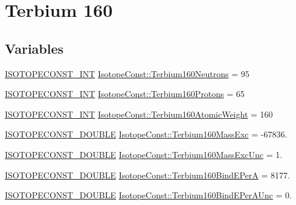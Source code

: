 \hypertarget{group___isotope_const-_terbium-_tb160}{}\section{Terbium 160}
\label{group___isotope_const-_terbium-_tb160}
\subsection*{Variables}
\begin{DoxyCompactItemize}
\item 
\mbox{\hyperlink{group___isotope_const-_macros_ga5f18360b3e99483a35c32d789e62621c}{I\+S\+O\+T\+O\+P\+E\+C\+O\+N\+S\+T\+\_\+\+I\+NT}} \mbox{\hyperlink{group___isotope_const-_terbium-_tb160_ga1d6cff90fdb1ebc29bb4fb3bbe757907}{Isotope\+Const\+::\+Terbium160\+Neutrons}} = 95
\item 
\mbox{\hyperlink{group___isotope_const-_macros_ga5f18360b3e99483a35c32d789e62621c}{I\+S\+O\+T\+O\+P\+E\+C\+O\+N\+S\+T\+\_\+\+I\+NT}} \mbox{\hyperlink{group___isotope_const-_terbium-_tb160_gae76b8fa4c5430a6d603b71c767d3b60d}{Isotope\+Const\+::\+Terbium160\+Protons}} = 65
\item 
\mbox{\hyperlink{group___isotope_const-_macros_ga5f18360b3e99483a35c32d789e62621c}{I\+S\+O\+T\+O\+P\+E\+C\+O\+N\+S\+T\+\_\+\+I\+NT}} \mbox{\hyperlink{group___isotope_const-_terbium-_tb160_gafd3d56c9b8c092c68b61b9749023f80b}{Isotope\+Const\+::\+Terbium160\+Atomic\+Weight}} = 160
\item 
\mbox{\hyperlink{group___isotope_const-_macros_ga8f45a7272ce02c0b4c65c44636ed719a}{I\+S\+O\+T\+O\+P\+E\+C\+O\+N\+S\+T\+\_\+\+D\+O\+U\+B\+LE}} \mbox{\hyperlink{group___isotope_const-_terbium-_tb160_gaaa163c7db9e426a24c9a46fc5c3fe41c}{Isotope\+Const\+::\+Terbium160\+Mass\+Exc}} = -\/67836.
\item 
\mbox{\hyperlink{group___isotope_const-_macros_ga8f45a7272ce02c0b4c65c44636ed719a}{I\+S\+O\+T\+O\+P\+E\+C\+O\+N\+S\+T\+\_\+\+D\+O\+U\+B\+LE}} \mbox{\hyperlink{group___isotope_const-_terbium-_tb160_ga47c2153b6b83c16c4cf5cf327f677b34}{Isotope\+Const\+::\+Terbium160\+Mass\+Exc\+Unc}} = 1.
\item 
\mbox{\hyperlink{group___isotope_const-_macros_ga8f45a7272ce02c0b4c65c44636ed719a}{I\+S\+O\+T\+O\+P\+E\+C\+O\+N\+S\+T\+\_\+\+D\+O\+U\+B\+LE}} \mbox{\hyperlink{group___isotope_const-_terbium-_tb160_gad8f172508f3498d27c53bdefd095f3fb}{Isotope\+Const\+::\+Terbium160\+Bind\+E\+PerA}} = 8177.
\item 
\mbox{\hyperlink{group___isotope_const-_macros_ga8f45a7272ce02c0b4c65c44636ed719a}{I\+S\+O\+T\+O\+P\+E\+C\+O\+N\+S\+T\+\_\+\+D\+O\+U\+B\+LE}} \mbox{\hyperlink{group___isotope_const-_terbium-_tb160_gaef35ab807f6136adf162ca932f317b76}{Isotope\+Const\+::\+Terbium160\+Bind\+E\+Per\+A\+Unc}} = 0.

\end{DoxyCompactItemize}
